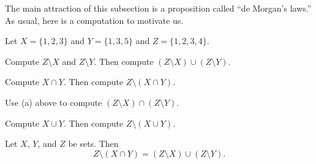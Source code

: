 \documentclass[../notes.tex]{subfiles}
\begin{document}
The main attraction of this subsection is a proposition called ``de Morgan's laws.'' As usual, here is a computation to motivate us.
\begin{example}
    Let $X=\{1,2,3\}$ and $Y=\{1,3,5\}$ and $Z=\{1,2,3,4\}$.
    \begin{listalph}
        \item Compute $Z\setminus X$ and $Z\setminus Y$. Then compute $(Z\setminus X)\cup(Z\setminus Y)$.
        \item Compute $X\cap Y$. Then compute $Z\setminus(X\cap Y)$.
        \item Use (a) above to compute $(Z\setminus X)\cap(Z\setminus Y)$.
        \item Compute $X\cup Y$. Then compute $Z\setminus(X\cup Y)$.
    \end{listalph}
\end{example}
\begin{proposition}  \label{prop:de-morgan}
    Let $X$, $Y$, and $Z$ be sets. Then
    \[Z\setminus(X\cap Y)=(Z\setminus X)\cup(Z\setminus Y).\]
\end{proposition}
\end{document}
